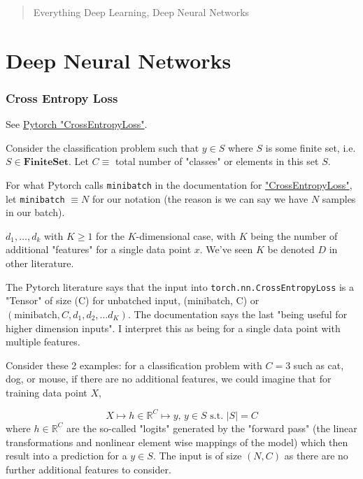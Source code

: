 \documentclass[10pt]{amsart}
\begin{document}
\begin{multicols*}{2}
		
\setcounter{tocdepth}{1}
\tableofcontents
		
\begin{abstract}
Everything Deep Learning, Deep Neural Networks
\end{abstract}
		
\part{Deep Neural Networks}

\section{Cross Entropy Loss}

See \href{https://pytorch.org/docs/stable/generated/torch.nn.CrossEntropyLoss.html?highlight=crossentropyloss}{Pytorch "CrossEntropyLoss"}.

Consider the classification problem such that $y \in S$ where $S$ is some finite set, i.e. $S \in \textbf{FiniteSet}$. Let $C \equiv $ total number of "classes" or elements in this set $S$.

For what Pytorch calls \verb|minibatch| in the documentation for \href{https://pytorch.org/docs/stable/generated/torch.nn.CrossEntropyLoss.html?highlight=crossentropyloss}{"CrossEntropyLoss"}, let \verb|minibatch| $\equiv N$ for our notation (the reason is we can say we have $N$ samples in our batch).

$d_1, \dots, d_k$ with $K\geq 1$ for the $K$-dimensional case, with $K$ being the number of additional "features" for a single data point $x$. We've seen $K$ be denoted $D$ in other literature. 

The Pytorch literature says that the input into \verb|torch.nn.CrossEntropyLoss| is a "Tensor" of size (C) for unbatched input, (minibatch, C) or $(\text{minibatch}, C, d_1, d_2, \dots d_K)$. The documentation says the last "being useful for higher dimension inputs". I interpret this as being for a single data point with multiple features.

Consider these 2 examples: for a classification problem with $C = 3$ such as cat, dog, or mouse, if there are no additional features, we could imagine that for training data point $X$,

\[
X \mapsto h \in \mathbb{R}^C \mapsto y, \, y\in S \text{ s.t. } |S| = C
\]
where $h \in \mathbb{R}^C$ are the so-called "logits" generated by the "forward pass" (the linear transformations and nonlinear element wise mappings of the model) which then result into a prediction for a $y \in S$. The input is of size $(N, C)$ as there are no further additional features to consider.


\end{multicols*}
\end{document}
